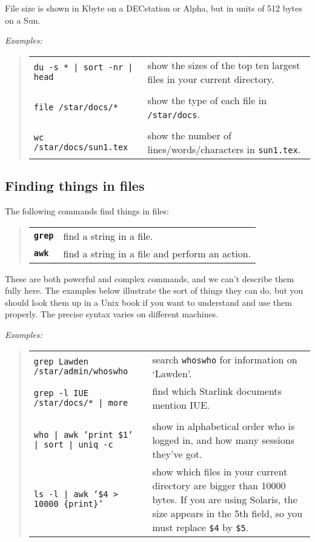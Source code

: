 File size is shown in Kbyte on a DECstation or Alpha, but in units of 512 bytes
on a Sun.

{\em Examples:}

\begin{quote}
\begin{tabular}{lp{3.5in}}
{\tt du -s * | sort -nr | head} & show the sizes of the top ten largest files
   in your current directory.\\
\\
{\tt file /star/docs/*} & show the type of each file in {\tt /star/docs}.\\
\\
{\tt wc /star/docs/sun1.tex} & show the number of lines/words/characters in
    {\tt sun1.tex}.
\end{tabular}
\end{quote}

\subsection{Finding things in files}

The following commands find things in files:

\begin{quote}
\begin{tabular}{lp{5.2in}}

{\tt\bf grep}  & find a string in a file.\\
{\tt\bf awk}   & find a string in a file and perform an action.

\end{tabular}
\end{quote}
These are both powerful and complex commands, and we can't describe them fully
here.
The examples below illustrate the sort of things they can do, but you should
look them up in a Unix book if you want to understand and use them properly.
The precise syntax varies on different machines.

\goodbreak

{\em Examples:}

\begin{quote}
\begin{tabular}{lp{2.8in}}
{\tt grep Lawden /star/admin/whoswho} & search {\tt whoswho} for information on
`Lawden'.\\
{\tt grep -l IUE /star/docs/* | more } & find which Starlink documents mention
IUE.\\
\\
{\tt who | awk '{print \$1}' | sort | uniq -c} & show in alphabetical order who
    is logged in, and how many sessions they've got.\\
{\tt ls -l | awk '\$4 > 10000 \{print\}'} & show which files in your current
    directory are bigger than 10000 bytes.  If you are using Solaris, the size
    appears in the 5th field, so you must replace {\tt \$4} by {\tt \$5}.
\end{tabular}
\end{quote}

